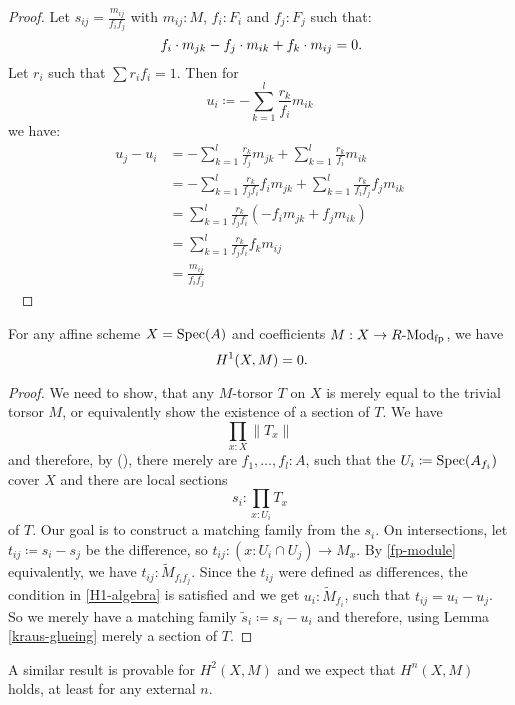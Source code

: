 \begin{proof}
  Let $s_{ij}=\frac{m_{ij}}{f_i f_j}$ with $m_{ij}:M$, $f_i:F_i$ and $f_j:F_j$ such that:
  \[ f_i\cdot m_{jk}-f_j\cdot m_{ik}+f_k\cdot m_{ij}=0 \rlap{.}\]
  Let $r_i$ such that $\sum r_i f_i =1$.
  Then for
  \[ u_i \coloneqq -\sum_{k=1}^l\frac{r_k}{f_i}m_{ik} \]
  we have:
  \begin{align*}
      u_j-u_i &= -\sum_{k=1}^l\frac{r_k}{f_j}m_{jk} + \sum_{k=1}^l\frac{r_k}{f_i}m_{ik} \\
              &= -\sum_{k=1}^l\frac{r_k}{f_j f_i}f_i m_{jk} + \sum_{k=1}^l\frac{r_k}{f_i f_j} f_j m_{ik} \\
              &= \sum_{k=1}^l\frac{r_k}{f_j f_i}(-f_i m_{jk} + f_j m_{ik}) \\
              &= \sum_{k=1}^l\frac{r_k}{f_j f_i}f_k m_{ij} \\
              &= \frac{m_{ij}}{f_i f_j}
  \end{align*}
  \ %
\end{proof}

\begin{theorem}%
  \label{H1-fp-module-affine-trivial}
  For any affine scheme $X=\operatorname{Spec}(A)$ and coefficients $M: X\to R\text{-}\mathrm{Mod}_{\text{fp}}$, we have
  \[ H^1(X,M)=0 \rlap{.} \]
\end{theorem}
\begin{proof}
  We need to show, that any $M$-torsor $T$ on $X$ is merely equal to the trivial torsor $M$,
  or equivalently show the existence of a section of $T$.
  We have
  \[ \prod_{x:X}\| T_x \|\]
  and therefore, by (),
  there merely are $f_1,\dots,f_l:A$,
  such that the $U_i\coloneqq \operatorname{Spec}(A_{f_i})$ cover $X$ and
  there are local sections
  \[ s_i:\prod_{x:U_i}T_x\]
  of $T$. Our goal is to construct a matching family from the $s_i$.
  On intersections, let $t_{ij}\coloneqq s_i-s_j$ be the difference, so $t_{ij}:(x : U_i\cap U_j) \to M_x$.
  By \cref{fp-module} equivalently, we have $t_{ij}:\tilde{M}_{f_i f_j}$.
  Since the $t_{ij}$ were defined as differences,
  the condition in \cref{H1-algebra} is satisfied and we get
  $u_i:\tilde{M}_{f_i}$, such that $t_{ij}=u_i-u_j$.
  So we merely have a matching family $\tilde{s}_i\coloneqq s_i-u_i$ and therefore, using Lemma \ref{kraus-glueing} merely a section of $T$.
\end{proof}

A similar result is provable for $H^2(X,M)$ and we expect that $H^n(X,M)$ holds, at least for any external $n$.

